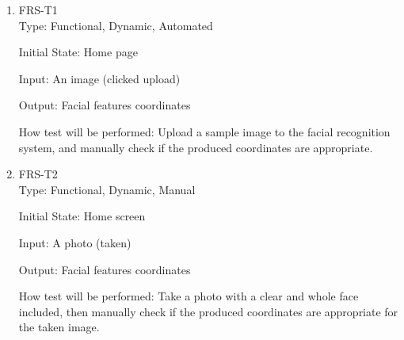 \documentclass[12pt, titlepage]{article}
\begin{document}
\begin{enumerate}

\item{FRS-T1\\}
Type: Functional, Dynamic, Automated
					
Initial State: Home page
					
Input: An image (clicked upload)
					
Output: Facial features coordinates

How test will be performed: Upload a sample image to the facial recognition system, and manually check if the produced coordinates are appropriate.
					
\item{FRS-T2\\}
Type: Functional, Dynamic, Manual
                    
Initial State: Home screen
					
Input: A photo (taken)
					
Output: Facial features coordinates
					
How test will be performed: Take a photo with a clear and whole face included, then manually check if the produced coordinates are appropriate for the taken image. 

\end{enumerate}
\end{document}
